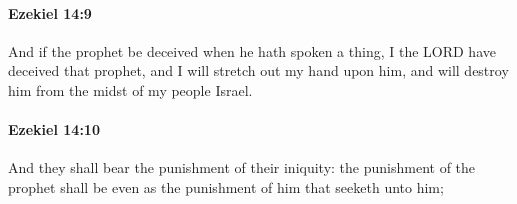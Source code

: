 		\paragraph{Ezekiel 14:9} %
			\label{EZEKIEL-14-9}

			And if the prophet be deceived when he hath spoken a thing, I the LORD have deceived that prophet, and I will stretch out my hand upon him, and will destroy him from the midst of my people Israel.


		\paragraph{Ezekiel 14:10} %
			\label{EZEKIEL-14-10}

			And they shall bear the punishment of their iniquity: the punishment of the prophet shall be even as the punishment of him that seeketh unto him;


